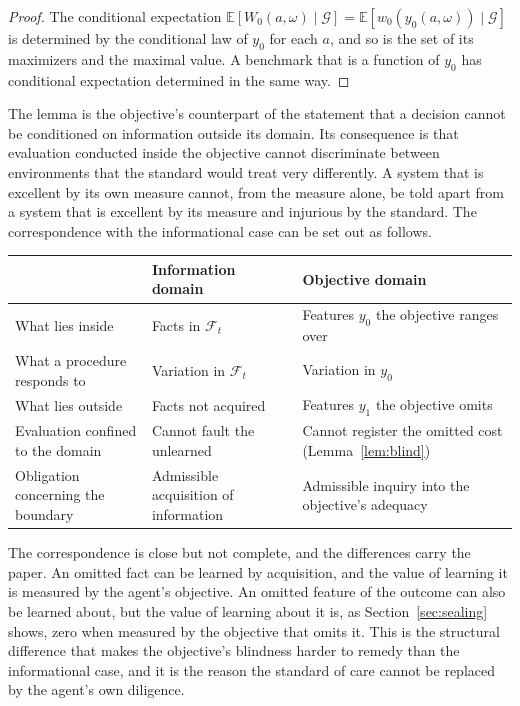 \documentclass[11pt]{article}
\newcommand{\F}{\mathcal F}
\newcommand{\G}{\mathcal G}
\newcommand{\E}{\mathbb E}
\theoremstyle{plain}
\theoremstyle{definition}
\begin{document}
\begin{proof}
The conditional expectation $\E[W_0(a,\omega)\mid\G]=\E[w_0(y_0(a,\omega))\mid\G]$ is determined by the conditional law of $y_0$ for each $a$, and so is the set of its maximizers and the maximal value. A benchmark that is a function of $y_0$ has conditional expectation determined in the same way.
\end{proof}

The lemma is the objective's counterpart of the statement that a decision cannot be conditioned on information outside its domain. Its consequence is that evaluation conducted inside the objective cannot discriminate between environments that the standard would treat very differently. A system that is excellent by its own measure cannot, from the measure alone, be told apart from a system that is excellent by its measure and injurious by the standard. The correspondence with the informational case can be set out as follows.

\begin{center}
\small
\begin{tabular}{@{}p{}p{}p{}@{}}
\hline
 & Information domain & Objective domain\\
\hline
What lies inside & Facts in $\F_t$ & Features $y_0$ the objective ranges over\\
What a procedure responds to & Variation in $\F_t$ & Variation in $y_0$\\
What lies outside & Facts not acquired & Features $y_1$ the objective omits\\
Evaluation confined to the domain & Cannot fault the unlearned & Cannot register the omitted cost (Lemma~\ref{lem:blind})\\
Obligation concerning the boundary & Admissible acquisition of information & Admissible inquiry into the objective's adequacy\\
\hline
\end{tabular}
\end{center}

The correspondence is close but not complete, and the differences carry the paper. An omitted fact can be learned by acquisition, and the value of learning it is measured by the agent's objective. An omitted feature of the outcome can also be learned about, but the value of learning about it is, as Section~\ref{sec:sealing} shows, zero when measured by the objective that omits it. This is the structural difference that makes the objective's blindness harder to remedy than the informational case, and it is the reason the standard of care cannot be replaced by the agent's own diligence.
\end{document}
